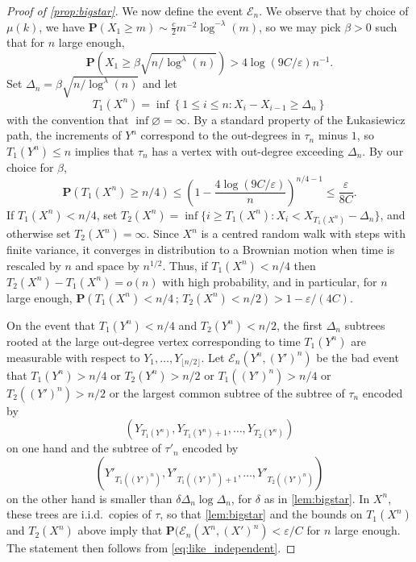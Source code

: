\documentclass[11pt,reqno]{amsart}
\renewcommand{\P}{\mathbf{P}}
\newcommand{\1}{\mathbf{1}}
\newcommand{\0}{\mathbf{0}}
\newcommand\cE{\mathcal E}
\newcommand{\eps}{\varepsilon}
\renewcommand{\emptyset}{\varnothing}
\begin{document}
\begin{proof}[Proof of \cref{prop:bigstar}]
We now define the event $\cE_n$. We observe that by choice of $\mu(k)$, we have $\P(X_1\ge m)\sim \tfrac{c}{2}m^{-2}\log^{-\lambda}(m)$, so we may pick $\beta>0$ such that for $n$ large enough, \[\P\left( X_1\ge \beta \sqrt{n/\log^\lambda(n)} \right)>4\log(9C/\eps)n^{-1}.\] Set $\Delta_n=\beta \sqrt{n/\log^\lambda(n)}$ and let \[T_1(X^n)=\inf\left\{1\le i \le n: X_{i}-X_{i-1}\ge \Delta_n\right\} \] 
with the convention that $\inf\emptyset = \infty$. By a standard property of the \L ukasiewicz path, the increments of $Y^n$ correspond to the out-degrees in $\tau_n$ minus $1$, so $T_1(Y^n)\le n$ implies that $\tau_n$ has a vertex with out-degree exceeding $\Delta_n$. 
By our choice for $\beta$, \[\P(T_1(X^n)\geq n/4) \le \left(1-\frac{4\log(9C/\eps)}{n}\right)^{n/4-1}\le \frac{\eps}{8C}.\] If $T_1(X^n)< n/4$, set $T_2(X^n)=\inf\{i\geq T_1(X^n): X_i<X_{T_1(X^n)}-\Delta_n\}$, and otherwise set $T_2(X^n)=\infty$. Since $X^n$ is a centred random walk with steps with finite variance, it converges in distribution to a Brownian motion when time is rescaled by $n$ and space by $n^{1/2}$. Thus, if $T_1(X^n)<n/4$ then $T_2(X^n)-T_1(X^n)=o(n)$ with high probability, and in particular, for $n$ large enough, $\P(T_1(X^n)<n/4 \,;\, T_2(X^n)<n/2)>1-\eps/(4C)$. 

On the event that $T_1(Y^n)<n/4$ and $T_2(Y^n)<n/2$, the first $\Delta_n$ subtrees rooted at the large out-degree vertex corresponding to time $T_1(Y^n)$ are measurable with respect to $Y_1,\dots, Y_{\lfloor n/2\rfloor}$.  Let $\cE_n(Y^n,(Y')^n)$ be the bad event that $T_1(Y^n)>n/4$ or $T_2(Y^n)>n/2$ or $T_1((Y')^n)>n/4$ or $T_2((Y')^n)>n/2$ or the largest common subtree of the subtree of $\tau_n$ encoded by \[(Y_{T_1(Y^n)},Y_{{T_1(Y^n)}+1}, \dots, Y_{T_2(Y^n)})\] on one hand and the subtree of $\tau'_n$ encoded by \[(Y'_{T_1((Y')^n)},Y'_{{T_1((Y')^n)}+1}, \dots, Y'_{T_2((Y')^n)})\] on the other hand is smaller than $\delta \Delta_n\log \Delta_n$, for $\delta$ as in \cref{lem:bigstar}. In $X^n$, these trees are i.i.d.~copies of $\tau$, so that \cref{lem:bigstar} and the bounds on $T_1(X^n)$ and $T_2(X^n)$ above imply that $\P(\cE_n(X^n,(X')^n)<\eps/C$ for $n$ large enough. The statement then follows from \eqref{eq:like_independent}.
\end{proof}





\end{document}
